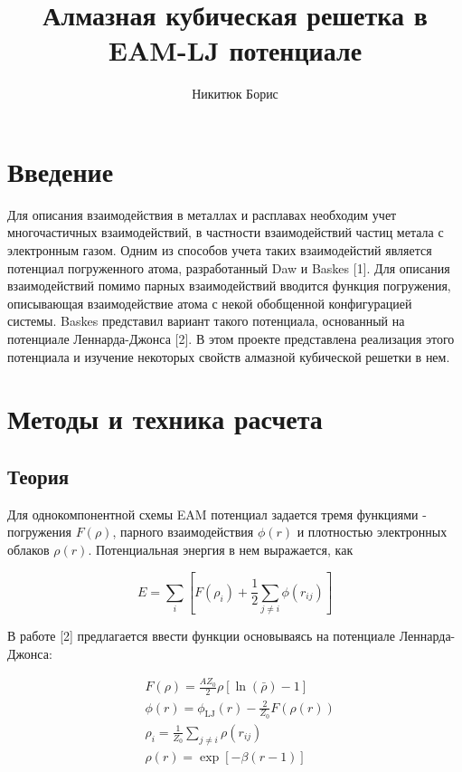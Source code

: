 \documentclass[12pt]{article}
\begin{document}
\title{Алмазная кубическая решетка в EAM-LJ потенциале}
\author{Никитюк Борис}
\date{}
\maketitle
\newpage

\section{Введение}
Для описания взаимодействия в металлах и расплавах необходим учет многочастичных взаимодействий, в частности взаимодействий частиц метала с электронным газом. Одним из способов учета таких взаимодейстий является потенциал погруженного атома, разработанный Daw и Baskes [1]. Для описания взаимодействий помимо парных взаимодействий вводится функция погружения, описывающая взаимодействие атома с некой обобщенной конфигурацией системы. Baskes представил вариант такого потенциала, основанный на потенциале Леннарда-Джонса [2]. В этом проекте представлена реализация этого потенциала и изучение некоторых свойств алмазной кубической решетки в нем. 

\section{Методы и техника расчета}
\subsection{Теория}
Для однокомпонентной схемы EAM потенциал задается тремя функциями - погружения $F(\rho)$, парного взаимодействия $\phi(r)$ и плотностью электронных облаков $\rho(r)$. Потенциальная энергия в нем выражается, как 

\begin{equation}
E=\sum_{i}\left[F\left({\rho}_{i}\right)+\frac{1}{2} \sum_{j \neq i} \phi\left(r_{i j}\right)\right]
\end{equation}

В работе [2] предлагается ввести функции основываясь на потенциале Леннарда-Джонса:

\begin{subequations}
\begin{align}
& F(\rho)=\frac{A Z_{0}}{2} \rho [\ln (\bar{\rho})-1] \\
& \phi(r)=\phi_{\mathrm{LJ}}(r)-\frac{2}{Z_{0}} F(\rho(r)) \\
& \rho_{i}=\frac{1}{Z_{0}} \sum_{j \neq i} \rho\left(r_{i j}\right) \\
& \rho(r)=\exp [-\beta(r-1)]
\end{align}
\end{subequations}
\end{document}
